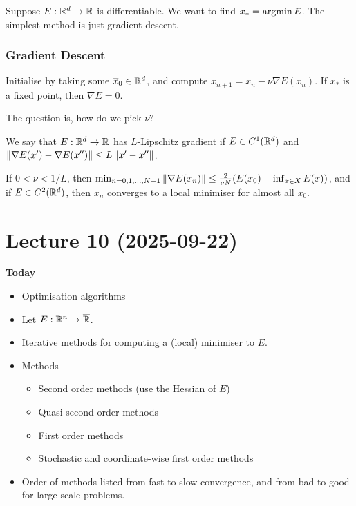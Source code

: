 \documentclass[12pt]{article}
\begin{document}
Suppose $E:\mathbb{R}^d\to\mathbb{R}$ is differentiable. We want to find $x_*=\operatorname{argmin} E$. The simplest method is just gradient descent.

\subsubsection{Gradient Descent}
Initialise by taking some $\overline{x}_0\in \mathbb{R}^d$, and compute $\bar{x}_{n+1} = \bar{x}_n - \nu \nabla E(\bar{x}_n)$. If $\bar{x}_*$ is a fixed point, then $\nabla E = 0$. 

The question is, how do we pick $\nu$?

\begin{definition}
    We say that $E:\mathbb{R}^d\to \mathbb{R}$ has $L$-Lipschitz gradient if $E\in C^1(\mathbb{R}^d)$ and $\left\lVert\nabla E(x') - \nabla E(x'')\right\rVert\leq L\left\lVert x'-x''\right\rVert$.
\end{definition}

\begin{theorem}
    If $0<\nu<1/L$, then $\min_{n=0,1,\dots,N-1} \left\lVert\nabla E(x_n)\right\rVert\leq \frac{2}{\nu N}(E(x_0)-\inf_{x\in X} E(x))$, and if $E\in C^2(\mathbb{R}^d)$, then $x_n$ converges to a local minimiser for almost all $x_0$.
\end{theorem}

\newpage

\section{Lecture 10 (2025-09-22)}

\textbf{Today}
\begin{itemize}
    \item Optimisation algorithms
\end{itemize}

\begin{itemize}
    \item Let $E:\mathbb{R}^n\to\overline{\mathbb{R}}$. 
    \item Iterative methods for computing a (local) minimiser to $E$.
    \item Methods
    \begin{itemize}
        \item Second order methods (use the Hessian of $E$)
        \item Quasi-second order methods
        \item First order methods
        \item Stochastic and coordinate-wise first order methods
    \end{itemize}
    \item Order of methods listed from fast to slow convergence, and from bad to good for large scale problems.
\end{itemize}
\end{document}
